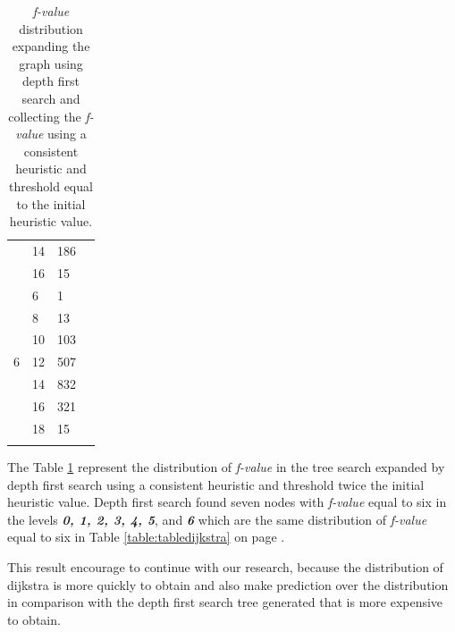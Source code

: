 \documentclass[11pt,a4paper,oneside]{report}
\begin{document}
\begin{longtable}{@{\extracolsep{\fill}} llll @{}}
                    & 14      & 186      \\ \cline{2-3} 
                    & 16      & 15       \\ \hline
\multirow{7}{*}{6}  & 6       & 1        \\ \cline{2-3} 
                    & 8       & 13       \\ \cline{2-3} 
                    & 10      & 103      \\ \cline{2-3} 
                    & 12      & 507      \\ \cline{2-3} 
                    & 14      & 832      \\ \cline{2-3} 
                    & 16      & 321      \\ \cline{2-3} 
                    & 18      & 15       \\ \hline
\caption{\textit{f-value} distribution expanding the graph using depth first search and collecting the \textit{f-value} using a consistent heuristic and threshold equal to the initial heuristic value.}
\label{table:tabledfs}
\end{longtable}

The Table \ref{table:tabledfs} represent the distribution of \textit{f-value} in the tree search expanded by depth first search using a consistent heuristic and threshold twice the initial heuristic value. Depth first search found seven nodes with \textit{f-value} equal to six in the levels \textbf{\textit{0, 1, 2, 3, 4, 5}}, and  \textbf{\textit{6}} which are the same distribution of \textit{f-value} equal to six  in Table \ref{table:tabledijkstra} on page \pageref{table:tabledijkstra}.\newline


This result encourage to continue with our research, because the distribution of dijkstra is more quickly to obtain and also make prediction over the distribution in comparison with the depth first search tree generated that is more expensive to obtain.\newline
\end{document}
